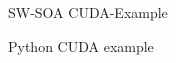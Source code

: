 %
\begin{Frame}{SW-SOA CUDA-Example}
  \begin{block}{Python CUDA example}
    
  \end{block}   
\end{Frame}


